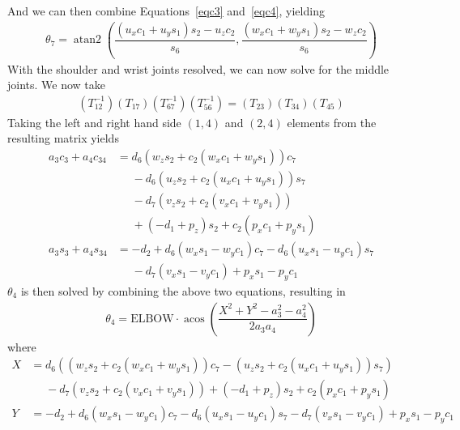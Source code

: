 \documentclass{article}
\DeclareMathOperator{\atantwo}{atan2}
\DeclareMathOperator{\acos}{acos}
\begin{document}
And we can then combine Equations~\ref{eqc3} and~\ref{eqc4}, yielding
\begin{align}
\boxed{\theta_7 = \atantwo \left( \dfrac{\left(u_x c_1 + u_y s_1\right) s_2 - u_z c_2}{s_6},
                                  \dfrac{\left(w_x c_1 + w_y s_1\right) s_2 - w_z c_2}{s_6}\right)}
\end{align}
With the shoulder and wrist joints resolved, we can now solve for the middle joints.
We now take
\begin{align*}
\left(T_{12}^{-1} \right) \left(T_{17}\right) \left(T_{67}^{-1}\right) \left(T_{56}^{-1}\right) = \left(T_{23}\right) \left(T_{34}\right) \left(T_{45}\right)
\end{align*}
Taking the left and right hand side $\left(1, 4\right)$ and $\left(2, 4 \right)$ elements from the resulting matrix yields
\begin{align}
a_{3} c_{3} + a_{4} c_{34} &= d_{6} \left(w_z s_{2} + c_{2}\left(w_x c_{1} + w_y s_{1}\right) \right) c_{7} \nonumber \\
                           &\phantom{=} - d_{6} \left(u_z s_{2} + c_{2}\left(u_x c_{1} + u_y s_{1} \right) \right) s_{7}  \nonumber \\
                           &\phantom{=} - d_{7} \left(v_z s_{2} + c_{2}\left(v_x c_{1} + v_y s_{1} \right) \right) \nonumber \\
                           &\phantom{=}+ \left(- d_{1} + p_z\right) s_{2} + c_{2}\left(p_x c_{1} + p_y s_{1}\right) \label{mj1} \\
a_{3} s_{3} + a_{4} s_{34} &= - d_{2} + d_{6} \left(w_x s_{1} - w_y c_{1}\right) c_{7} - d_{6} \left(u_x s_{1} - u_y c_{1}\right) s_{7} \nonumber \\
                           &\phantom{=} - d_{7} \left(v_x s_{1} - v_y c_{1}\right) + p_x s_{1} - p_y c_{1} \label{mj2}
\end{align}
$\theta_4$ is then solved by combining the above two equations, resulting in
\begin{align}
\boxed{\theta_4 = \mbox{ELBOW} \cdot \acos \left( \dfrac{X^2 + Y^2 - a_3^2 - a_4^2}{2 a_3 a_4} \right)}
\end{align}
where
\begin{align*}
X &= d_{6} \left( \left(w_z s_{2} + c_{2}\left(w_x c_{1} + w_y s_{1}\right) \right) c_{7} - \left(u_z s_{2} + c_{2}\left(u_x c_{1} + u_y s_{1} \right) \right) s_{7} \right) \nonumber \\
  &\phantom{=}- d_{7} \left(v_z s_{2} + c_{2}\left(v_x c_{1} + v_y s_{1} \right) \right) + \left(- d_{1} + p_z\right) s_{2} + c_{2}\left(p_x c_{1} + p_y s_{1}\right) \\
Y &= - d_{2} + d_{6} \left(w_x s_{1} - w_y c_{1}\right) c_{7} - d_{6} \left(u_x s_{1} - u_y c_{1}\right) s_{7} - d_{7} \left(v_x s_{1} - v_y c_{1}\right) + p_x s_{1} - p_y c_{1}
\end{align*}
\end{document}

